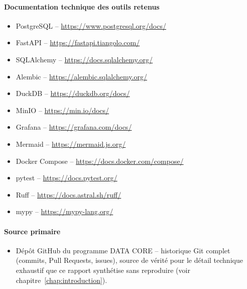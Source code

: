 \paragraph{Documentation technique des outils retenus}
\begin{itemize}
  \item PostgreSQL -- \url{https://www.postgresql.org/docs/}
  \item FastAPI -- \url{https://fastapi.tiangolo.com/}
  \item SQLAlchemy -- \url{https://docs.sqlalchemy.org/}
  \item Alembic -- \url{https://alembic.sqlalchemy.org/}
  \item DuckDB -- \url{https://duckdb.org/docs/}
  \item MinIO -- \url{https://min.io/docs/}
  \item Grafana -- \url{https://grafana.com/docs/}
  \item Mermaid -- \url{https://mermaid.js.org/}
  \item Docker Compose -- \url{https://docs.docker.com/compose/}
  \item pytest -- \url{https://docs.pytest.org/}
  \item Ruff -- \url{https://docs.astral.sh/ruff/}
  \item mypy -- \url{https://mypy-lang.org/}
\end{itemize}

\paragraph{Source primaire}
\begin{itemize}
  \item Dépôt GitHub du programme DATA CORE -- historique Git complet
    (commits, Pull Requests, issues), source de vérité pour le détail
    technique exhaustif que ce rapport synthétise sans reproduire (voir
    chapitre~\ref{chap:introduction}).
\end{itemize}
